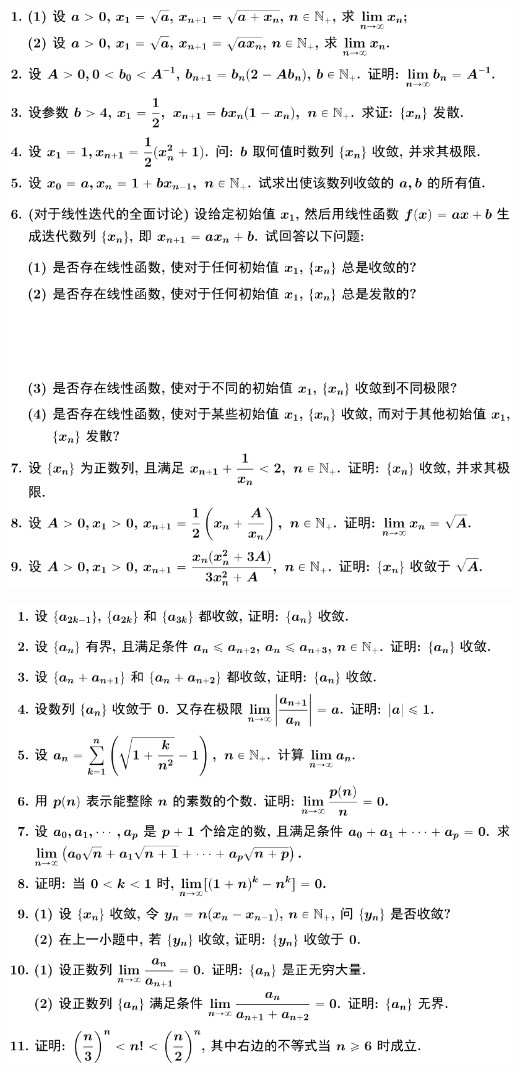 \documentclass[11pt,a4paper]{ctexart}
\begin{document}
\begin{paracol}{2}
\includegraphics[width=\linewidth]{figure08.png}
\newpage
{}

\includegraphics[width=\linewidth]{figure09.png}
\newpage
{}


\end{paracol}
\end{document}
